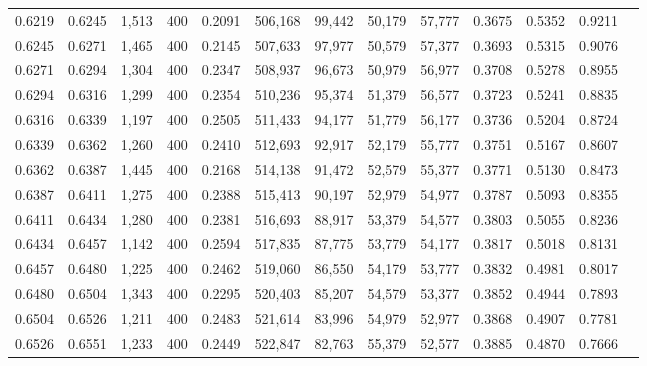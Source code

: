\begin{tabular}{rrrrrrrrrrrrr}
0.6219 & 0.6245 &  1,513 &   400 &                                     0.2091 & 506,168 &  99,442 &  50,179 &  57,777 & 0.3675 & 0.5352 & 0.9211 \\
0.6245 & 0.6271 &  1,465 &   400 &                                     0.2145 & 507,633 &  97,977 &  50,579 &  57,377 & 0.3693 & 0.5315 & 0.9076 \\
0.6271 & 0.6294 &  1,304 &   400 &                                     0.2347 & 508,937 &  96,673 &  50,979 &  56,977 & 0.3708 & 0.5278 & 0.8955 \\
0.6294 & 0.6316 &  1,299 &   400 &                                     0.2354 & 510,236 &  95,374 &  51,379 &  56,577 & 0.3723 & 0.5241 & 0.8835 \\
0.6316 & 0.6339 &  1,197 &   400 &                                     0.2505 & 511,433 &  94,177 &  51,779 &  56,177 & 0.3736 & 0.5204 & 0.8724 \\
0.6339 & 0.6362 &  1,260 &   400 &                                     0.2410 & 512,693 &  92,917 &  52,179 &  55,777 & 0.3751 & 0.5167 & 0.8607 \\
0.6362 & 0.6387 &  1,445 &   400 &                                     0.2168 & 514,138 &  91,472 &  52,579 &  55,377 & 0.3771 & 0.5130 & 0.8473 \\
0.6387 & 0.6411 &  1,275 &   400 &                                     0.2388 & 515,413 &  90,197 &  52,979 &  54,977 & 0.3787 & 0.5093 & 0.8355 \\
0.6411 & 0.6434 &  1,280 &   400 &                                     0.2381 & 516,693 &  88,917 &  53,379 &  54,577 & 0.3803 & 0.5055 & 0.8236 \\
0.6434 & 0.6457 &  1,142 &   400 &                                     0.2594 & 517,835 &  87,775 &  53,779 &  54,177 & 0.3817 & 0.5018 & 0.8131 \\
0.6457 & 0.6480 &  1,225 &   400 &                                     0.2462 & 519,060 &  86,550 &  54,179 &  53,777 & 0.3832 & 0.4981 & 0.8017 \\
0.6480 & 0.6504 &  1,343 &   400 &                                     0.2295 & 520,403 &  85,207 &  54,579 &  53,377 & 0.3852 & 0.4944 & 0.7893 \\
0.6504 & 0.6526 &  1,211 &   400 &                                     0.2483 & 521,614 &  83,996 &  54,979 &  52,977 & 0.3868 & 0.4907 & 0.7781 \\
0.6526 & 0.6551 &  1,233 &   400 &                                     0.2449 & 522,847 &  82,763 &  55,379 &  52,577 & 0.3885 & 0.4870 & 0.7666 \\

\end{tabular}
